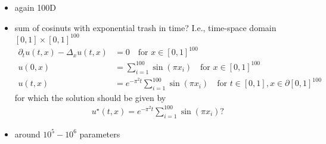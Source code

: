 \begin{itemize}
    \item again 100D 
    \item sum of cosinuts with exponential trash in time? I.e., 
    time-space domain $[0,1]\times[0,1]^{100}$ %
    \begin{align*}
        \partial_t u(t,x)-\Delta_x u(t,x) & = 0 \quad \text{for } x\in [0,1]^{100} \\ 
        u(0,x) & = \sum_{i=1}^{100} \sin(\pi x_i) \quad \text{for } 
        x\in [0,1]^{100}
        \\ 
        u(t,x) & = e^{-\pi^2 t}\sum_{i=1}^{100} \sin(\pi x_i) \quad \text{for } t\in[0,1], x\in\partial[0,1]^{100}
    \end{align*}
    for which the solution should be given by 
    \begin{align*}
        u^\star(t,x) = e^{-\pi^2 t} \sum_{i=1}^{100} \sin(\pi x_i)?
    \end{align*}
    \item around $10^5-10^6$ parameters 
\end{itemize}

